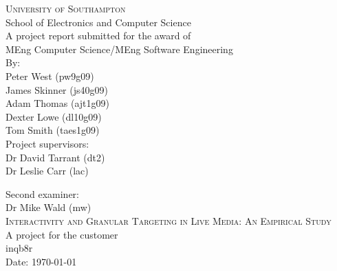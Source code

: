
\begin{titlepage}

\begin{center}

\textsc{\large{University of Southampton}}\\[0.0cm]

\large{School of Electronics and Computer Science}\\[2.0cm]

\large{A project report submitted for the award of}\\[0.0cm]

\large{MEng Computer Science/MEng Software Engineering}\\[2.0cm]

\large{
	By: \\
	Peter West (pw9g09) \\
	James Skinner (js40g09) \\
	Adam Thomas (ajt1g09) \\
	Dexter Lowe (dl10g09) \\
	Tom Smith (taes1g09)}\\[2.0cm]

\large{Project supervisors: \\
		Dr David Tarrant (dt2) \\
		Dr Leslie Carr (lac)}

\large{Second examiner: \\
		Dr Mike Wald (mw)}\\[2.0cm]


\textsc{\large Interactivity and Granular Targeting in Live Media: An Empirical Study}\\[2.0cm]

\large{A project for the customer \\
		inqb8r}\\[2.0cm]

\large{Date: \today}\\[4.0cm]

\end{center}

\end{titlepage}

